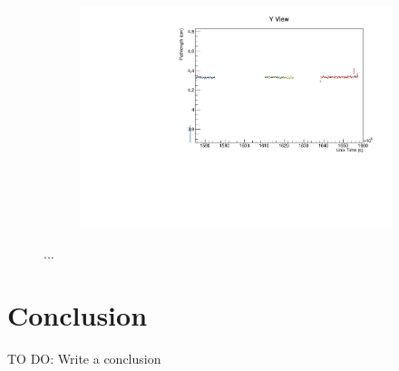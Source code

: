 \documentclass[12pt,a4paper]{article}
\begin{document}
\begin{figure}[!ht]
\begin{subfigure}{0.5\textwidth}
  \end{subfigure}
  \begin{subfigure}{0.5\textwidth}
    \includegraphics[width=\linewidth]{driftsec_tb/cm_time_y.pdf}
  \end{subfigure}
  \caption{...}
  \label{figAbsCalibDrift2}
\end{figure}

\FloatBarrier
\section{Conclusion}
TO DO: Write a conclusion



\end{document}
